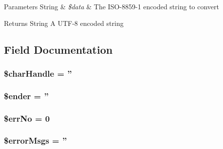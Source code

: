 \begin{DoxyParams}[1]{Parameters}
String & {\em \$data} & The ISO-\/8859-\/1 encoded string to convert \\
\hline
\end{DoxyParams}
\begin{DoxyReturn}{Returns}
String A UTF-\/8 encoded string 
\end{DoxyReturn}


\subsection{Field Documentation}
\hypertarget{classSavi__Parser_a5a878b1c34cc555349cbc4acbcdd54e7}{
\subsubsection[{\$charHandle}]{\setlength{\rightskip}{0pt plus 5cm}\$charHandle = ''}}
\label{classSavi__Parser_a5a878b1c34cc555349cbc4acbcdd54e7}
\hypertarget{classSavi__Parser_accbd2f26bb805e2a243cab5498237ac8}{
\subsubsection[{\$ender}]{\setlength{\rightskip}{0pt plus 5cm}\$ender = ''}}
\label{classSavi__Parser_accbd2f26bb805e2a243cab5498237ac8}
\hypertarget{classSavi__Parser_a63d046010fb22e14107bd3861e1d9dd5}{
\subsubsection[{\$errNo}]{\setlength{\rightskip}{0pt plus 5cm}\$errNo = 0}}
\label{classSavi__Parser_a63d046010fb22e14107bd3861e1d9dd5}
\hypertarget{classSavi__Parser_af21b3b8a4d4bcfa682cd5f411e0eb566}{
\subsubsection[{\$errorMsgs}]{\setlength{\rightskip}{0pt plus 5cm}\$errorMsgs = ''}}
